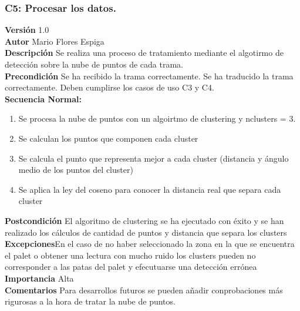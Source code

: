  \subsubsection{ C5: Procesar los datos.}
\textbf{Versión} 1.0\\
\textbf{Autor} Mario Flores Espiga\\
\textbf{Descripción} Se realiza una proceso de tratamiento mediante el algotirmo de detección sobre la nube de puntos de cada trama.\\
\textbf{Precondición} Se ha recibido la trama correctamente. Se ha traducido la trama correctamente. Deben cumplirse los casos de uso C3 y C4.\\
\textbf{Secuencia Normal:} 
\begin{enumerate}
	\item Se procesa la nube de puntos con un algoirtmo de clustering y nclusters = 3.
	\item Se calculan los puntos que componen cada cluster
	\item Se calcula el punto que representa mejor a cada cluster (distancia y ángulo medio de los puntos del cluster)
	\item Se aplica la ley del coseno para conocer la distancia real que separa cada cluster
	

\end{enumerate}
\textbf{Postcondición} El algoritmo de clustering se ha ejecutado con éxito y se han realizado los cálculos de cantidad de puntos y distancia que separa los clusters\\
\textbf{Excepciones}En el caso de no haber seleccionado la zona en la que se encuentra el palet o obtener una lectura con mucho ruido los clusters pueden no corresponder a las patas del palet y efecutuarse una detección errónea\\
\textbf{Importancia} Alta\\
\textbf{Comentarios} Para desarrollos futuros se pueden añadir conprobaciones más rigurosas a la hora de tratar la nube de puntos.

